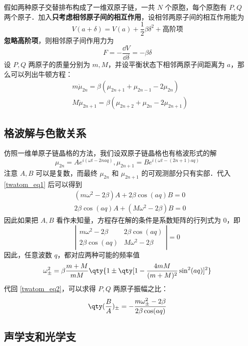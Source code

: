 
假如两种原子交替排布构成了一维双原子链，一共 $N$ 个原胞，每个原胞有 $P,Q$ 两个原子．加入\textbf{只考虑相邻原子间的相互作用}，设相邻两原子间的相互作用能为
\begin{equation}
V(a+\delta)=V(a)+\frac{1}{2}\beta \delta^2+\text{高阶项}
\end{equation}
\textbf{忽略高阶项}，则相邻原子间作用力为
\begin{equation}
F=-\frac{\dd V}{\dd \delta}=-\beta \delta
\end{equation}
设 $P,Q$ 两原子的质量分别为 $m,M$，并设平衡状态下相邻两原子间距离为 $a$，那么可以列出牛顿方程：
\begin{equation}\label{twatom_eq1}
\begin{aligned}
&m\ddot \mu_{2n}=\beta(\mu_{2n+1}+\mu_{2n-1}-2\mu_{2n})\\
&M\ddot \mu_{2n+1}=\beta(\mu_{2n+2}+\mu_{2n}-2\mu_{2n+1})
\end{aligned}
\end{equation}
\subsection{格波解与色散关系}
仿照一维单原子链晶格的方法，我们设双原子链晶格也有格波形式的解
\begin{equation}
\mu_{2n}=A e^{i(\omega t - 2naq)},\mu_{2n+1}=B  e^{i(\omega t - (2n+1)aq)}
\end{equation}
注意 $A,B$ 可以是复数，而最终 $\mu_{2n}$ 和 $\mu_{2n+1}$ 的可观测部分只有实部．代入\autoref{twatom_eq1} 后可以得到
\begin{equation}\label{twatom_eq2}
\begin{aligned}
&(m\omega^2-2\beta)A+2\beta\cos(aq)B=0\\
&2\beta\cos(aq)A+(M\omega^2-2\beta)B=0
\end{aligned}
\end{equation}
因此如果把 $A,B$ 看作未知量，方程存在解的条件是系数矩阵的行列式为 $0$，即
\begin{equation}
\left|
\begin{matrix}
m\omega^2-2\beta&2\beta\cos(aq)\\
2\beta\cos(aq)&M\omega^2-2\beta
\end{matrix}
\right|=0
\end{equation}
因此，任意波数 $q$，都对应两种可能的频率值
\begin{equation}
\omega_{\pm}^2=\beta\frac{m+M}{mM}\qty{1\pm \qty[1-\frac{4mM}{(m+M)^2}\sin^2(aq)]^2}
\end{equation}
代回 \autoref{twatom_eq2}，可以求得 $P,Q$ 两原子振幅之比：
\begin{equation}
\qty(\frac{B}{A})_{\pm}=-\frac{m\omega_{\pm}^2-2\beta}{2\beta\cos(aq)}
\end{equation}
\subsection{声学支和光学支}
